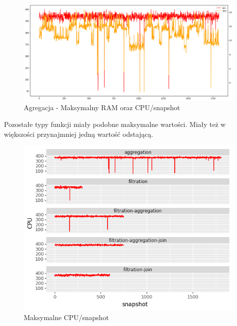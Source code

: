 \begin{figure}[H]
    \centering
    \captionsetup{justification=centering,margin=0.5cm}
    \includegraphics[scale=0.4]{figures/04-opis-danych/data-analysis/aggregation_max_ram_cpu.png}
    \caption{Agregacja - Maksymalny RAM oraz CPU/snapshot}
    \label{fig:scr46}
\end{figure}
Pozostałe typy funkcji miały podobne maksymalne wartości. Miały też w większości przynajmniej jedną wartość odstającą.
\begin{figure}[H]
    \centering
    \captionsetup{justification=centering,margin=0.5cm}
    \includegraphics[scale=1.0]{figures/04-opis-danych/data-analysis/all_max_cpu.png}
    \caption{Maksymalne CPU/snapshot}
    \label{fig:scr46}
\end{figure}
